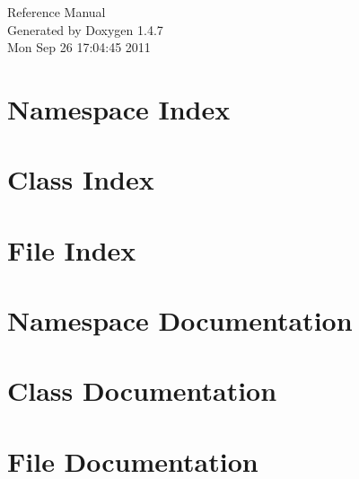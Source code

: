 \documentclass[a4paper]{book}
\begin{document}
\begin{titlepage}
\vspace*{7cm}
\begin{center}
{\Large Reference Manual}\\
\vspace*{1cm}
{\large Generated by Doxygen 1.4.7}\\
\vspace*{0.5cm}
{\small Mon Sep 26 17:04:45 2011}\\
\end{center}
\end{titlepage}
\clearemptydoublepage
{}
\tableofcontents
\clearemptydoublepage
{}
\chapter{Namespace Index}

\chapter{Class Index}

\chapter{File Index}

\chapter{Namespace Documentation}

\chapter{Class Documentation}





\chapter{File Documentation}

\printindex
\end{document}
